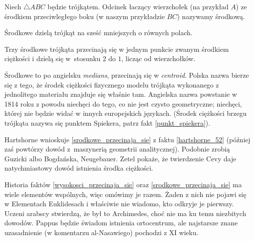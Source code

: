 \begin{definition}[środkowa]
%
    Niech $\triangle ABC$ będzie trójkątem.
    Odcinek łaczący wierzchołek (na przykład $A$) ze środkiem przeciwległego boku (w naszym przykładzie $BC$) nazywamy środkową.
\end{definition}

Środkowe dzielą trójkąt na sześć mniejszych o równych polach.

\begin{proposition}
\label{srodkowe_przecinaja_sie}%
%
    Trzy środkowe trójkąta przecinają się w jednym punkcie zwanym środkiem ciężkości i dzielą się w~stosunku $2$ do $1$, licząc od wierzchołków.
\end{proposition}

Środkowe to po angielsku \emph{medians}, przecinają się w \emph{centroid}.
Polska nazwa bierze się z tego, że środek ciężkości fizycznego modelu trójkąta wykonanego z jednolitego materiału znajduje się właśnie tam.
%
Angielska nazwa powstanie w 1814 roku z powodu niechęci do tego, co nie jest czysto geometryczne; niechęci, której nie będzie widać w innych europejskich językach.
(Środek ciężkości brzegu trójkąta nazywa się punktem Spiekera, patrz fakt \ref{punkt_spiekera}).

Hartshorne \cite[s. 52-54]{hartshorne2000} wnioskuje \ref{srodkowe_przecinaja_sie} z faktu \ref{hartshorne_52} (później zaś \cite[s. 119-120]{hartshorne2000} powtórzy dowód z~maszynerią geometrii analitycznej).
%
Podobnie zrobią Guzicki \cite[s. 220]{guzicki_2021} albo Bogdańska, Neugebauer.
Zetel \cite[s. 14, 25]{zetel_2020} pokaże, że twierdzenie Cevy daje natychmiastowy dowód istnienia środka ciężkości.

Historia faktów \ref{wysokosci_przecinaja_sie} oraz \ref{srodkowe_przecinaja_sie} ma wiele elementów wspólnych, więc omówimy je razem.
Żaden z nich nie pojawi się w Elementach Euklidesach i właściwie nie wiadomo, kto odkryje je pierwszy.
Uczeni arabscy stwierdzą, że był to Archimedes, choć nie ma ku temu niezbitych dowodów.
%
Pappus będzie świadom istnienia ortocentrum, ale najstarsze znane uzasadnienie (w komentarzu al-Nasawiego) pochodzi z XI wieku.
%
%

